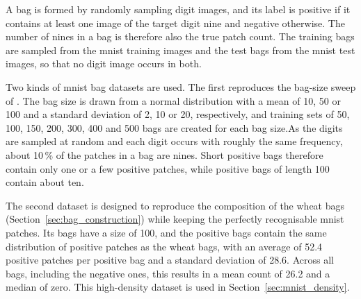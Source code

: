 \documentclass[12pt,parskip = half, DIV=classic,listof=totoc]{scrartcl}
\begin{document}
			A bag is formed by randomly sampling digit images, and
			its label is positive if it contains at least one image of the target digit nine
			and negative otherwise. The number of nines in a bag is therefore also the true
			patch count. The training bags are sampled from the \ac{mnist} training images and
			the test bags from the \ac{mnist} test images, so that no digit image occurs in
			both.

			Two kinds of \ac{mnist} bag datasets are used. The first reproduces the bag-size
			sweep of \textcite{ilseAttentionbasedDeepMultiple2018}. The bag size is drawn from a
			normal distribution with a mean of 10, 50 or 100 and a standard deviation of 2, 10
			or 20, respectively, and training sets of 50, 100, 150, 200, 300, 400 and 500 bags
			are created for each bag size.As the digits are sampled at random and each digit occurs with roughly the same
			frequency, about 10\,\% of the patches in a bag are nines. Short positive bags
			therefore contain only one or a few positive patches, while positive bags of
			length 100 contain about ten.

			The second dataset is designed to reproduce the composition of the wheat bags
			(Section~\ref{sec:bag_construction}) while keeping the perfectly recognisable
			\ac{mnist} patches. Its bags have a size of 100, and the positive bags contain the
			same distribution of positive patches as the wheat bags, with an average of 52.4
			positive patches per positive bag and a standard deviation of 28.6. Across all
			bags, including the negative ones, this results in a mean count of 26.2 and a
			median of zero. This high-density dataset is used in Section~\ref{sec:mnist_density}.
\end{document}
